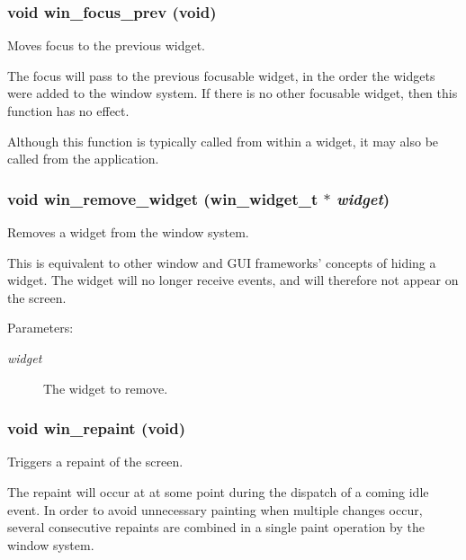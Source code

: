 \subsubsection{\setlength{\rightskip}{0pt plus 5cm}void win\_\-focus\_\-prev (void)}\label{winwidget_8h_a6}


Moves focus to the previous widget. 

The focus will pass to the previous focusable widget, in the order the widgets were added to the window system. If there is no other focusable widget, then this function has no effect.

Although this function is typically called from within a widget, it may also be called from the application. 
\subsubsection{\setlength{\rightskip}{0pt plus 5cm}void win\_\-remove\_\-widget ({\bf win\_\-widget\_\-t} $\ast$ {\em widget})}\label{winwidget_8h_a4}


Removes a widget from the window system. 

This is equivalent to other window and GUI frameworks' concepts of hiding a widget. The widget will no longer receive events, and will therefore not appear on the screen.

\begin{Desc}
\item[Parameters:]
\begin{description}
\item[{\em widget}]The widget to remove. \end{description}
\end{Desc}
\subsubsection{\setlength{\rightskip}{0pt plus 5cm}void win\_\-repaint (void)}\label{winwidget_8h_a18}


Triggers a repaint of the screen. 

The repaint will occur at at some point during the dispatch of a coming idle event. In order to avoid unnecessary painting when multiple changes occur, several consecutive repaints are combined in a single paint operation by the window system. 
